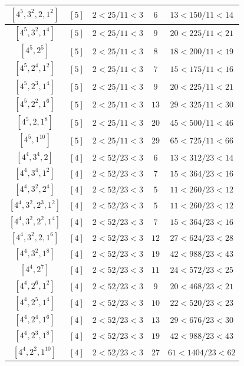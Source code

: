 \documentclass{article}%
\begin{document}
\begin{center}
\begin{longtable}{||c|c|c|c|c||}
$[4^{5}, 3^{2}, 2, 1^{2}]$ & $[5]$ & $2 < 25/11 < 3$ & $6$ & $13 < 150/11 < 14$ \\ \hline 
$[4^{5}, 3^{2}, 1^{4}]$ & $[5]$ & $2 < 25/11 < 3$ & $9$ & $20 < 225/11 < 21$ \\ \hline 
$[4^{5}, 2^{5}]$ & $[5]$ & $2 < 25/11 < 3$ & $8$ & $18 < 200/11 < 19$ \\ \hline 
$[4^{5}, 2^{4}, 1^{2}]$ & $[5]$ & $2 < 25/11 < 3$ & $7$ & $15 < 175/11 < 16$ \\ \hline 
$[4^{5}, 2^{3}, 1^{4}]$ & $[5]$ & $2 < 25/11 < 3$ & $9$ & $20 < 225/11 < 21$ \\ \hline 
$[4^{5}, 2^{2}, 1^{6}]$ & $[5]$ & $2 < 25/11 < 3$ & $13$ & $29 < 325/11 < 30$ \\ \hline 
$[4^{5}, 2, 1^{8}]$ & $[5]$ & $2 < 25/11 < 3$ & $20$ & $45 < 500/11 < 46$ \\ \hline 
$[4^{5}, 1^{10}]$ & $[5]$ & $2 < 25/11 < 3$ & $29$ & $65 < 725/11 < 66$ \\ \hline 
$[4^{4}, 3^{4}, 2]$ & $[4]$ & $2 < 52/23 < 3$ & $6$ & $13 < 312/23 < 14$ \\ \hline 
$[4^{4}, 3^{4}, 1^{2}]$ & $[4]$ & $2 < 52/23 < 3$ & $7$ & $15 < 364/23 < 16$ \\ \hline 
$[4^{4}, 3^{2}, 2^{4}]$ & $[4]$ & $2 < 52/23 < 3$ & $5$ & $11 < 260/23 < 12$ \\ \hline 
$[4^{4}, 3^{2}, 2^{3}, 1^{2}]$ & $[4]$ & $2 < 52/23 < 3$ & $5$ & $11 < 260/23 < 12$ \\ \hline 
$[4^{4}, 3^{2}, 2^{2}, 1^{4}]$ & $[4]$ & $2 < 52/23 < 3$ & $7$ & $15 < 364/23 < 16$ \\ \hline 
$[4^{4}, 3^{2}, 2, 1^{6}]$ & $[4]$ & $2 < 52/23 < 3$ & $12$ & $27 < 624/23 < 28$ \\ \hline 
$[4^{4}, 3^{2}, 1^{8}]$ & $[4]$ & $2 < 52/23 < 3$ & $19$ & $42 < 988/23 < 43$ \\ \hline 
$[4^{4}, 2^{7}]$ & $[4]$ & $2 < 52/23 < 3$ & $11$ & $24 < 572/23 < 25$ \\ \hline 
$[4^{4}, 2^{6}, 1^{2}]$ & $[4]$ & $2 < 52/23 < 3$ & $9$ & $20 < 468/23 < 21$ \\ \hline 
$[4^{4}, 2^{5}, 1^{4}]$ & $[4]$ & $2 < 52/23 < 3$ & $10$ & $22 < 520/23 < 23$ \\ \hline 
$[4^{4}, 2^{4}, 1^{6}]$ & $[4]$ & $2 < 52/23 < 3$ & $13$ & $29 < 676/23 < 30$ \\ \hline 
$[4^{4}, 2^{3}, 1^{8}]$ & $[4]$ & $2 < 52/23 < 3$ & $19$ & $42 < 988/23 < 43$ \\ \hline 
$[4^{4}, 2^{2}, 1^{10}]$ & $[4]$ & $2 < 52/23 < 3$ & $27$ & $61 < 1404/23 < 62$ \\ \hline 

\end{longtable}
\end{center}
\end{document}
